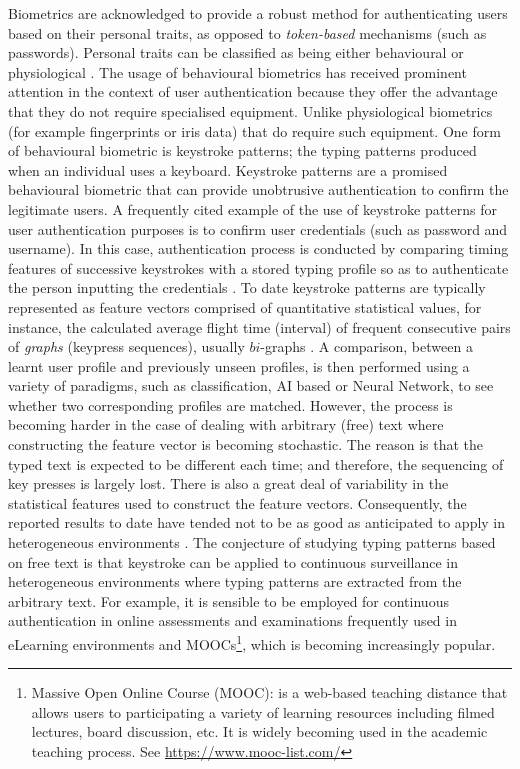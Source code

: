 \documentclass[runningheads,a4paper]{llncs}
\begin{document}
Biometrics are acknowledged to provide a robust method for authenticating users based on their personal traits, as opposed to \textit{token-based} mechanisms (such as passwords). Personal traits can be classified as being either behavioural or physiological \cite{polemi1997biometric}. The usage of behavioural biometrics has received prominent attention in the context of user authentication because they offer the advantage that they do not require specialised equipment\cite{yampolskiy2008behavioural}. Unlike physiological biometrics (for example fingerprints or iris data) that do require such equipment. One form of behavioural biometric is keystroke patterns; the typing patterns produced when an individual uses a keyboard. Keystroke patterns are a promised behavioural biometric that can provide unobtrusive authentication to confirm the legitimate users. A frequently cited example of the use of keystroke patterns for user authentication purposes is to confirm user credentials (such as password and username). In this case, authentication process is conducted by comparing timing features of successive keystrokes with a stored typing profile so as to authenticate the person inputting the credentials \cite{gaines1980authentication,bleha1990computer,joyce1990identity,ogihara2006biometric,Syed:2014ab}. To date keystroke patterns are typically represented as feature vectors comprised of quantitative statistical values, for instance, the calculated average flight time (interval) of frequent consecutive pairs of \textit{graphs} (keypress sequences), usually $bi$-graphs \cite{gaines1980authentication}. A comparison, between a learnt user profile and previously unseen profiles, is then performed using a variety of paradigms, such as classification, AI based or Neural Network, to see whether two corresponding profiles are matched. However, the process is becoming harder in the case of dealing with arbitrary (free) text where constructing the feature vector is becoming stochastic. The reason is that the typed text is expected to be different each time; and therefore, the sequencing of key presses is largely lost. There is also a great deal of variability in the statistical features used to construct the feature vectors. Consequently, the reported results to date have tended not to be as good as anticipated to apply in heterogeneous environments \cite{shepherd1995continuous,gunetti2005keystroke,e2006continuous,messerman2011continuous,bours2012continuous,ahmed2014biometric}.
The conjecture of studying typing patterns based on free text is that keystroke can be applied to continuous surveillance in heterogeneous environments where typing patterns are extracted from the arbitrary text. For example, it is sensible to be employed for continuous authentication in online assessments and examinations frequently used in eLearning environments and MOOCs\footnote{Massive Open Online Course (MOOC): is a web-based teaching distance that allows users to participating a variety of learning resources including filmed lectures, board discussion, etc. It is widely becoming used in the academic teaching process. See \url{https://www.mooc-list.com/}}, which is becoming increasingly popular.   
\end{document}
